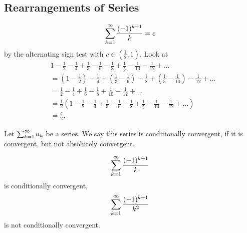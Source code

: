 \documentclass[10pt, a4paper]{article}
\begin{document}
\subsection{Rearrangements of Series}
\[
\sum_{k = 1}^{\infty}\frac{(-1) ^ {k + 1}}{k} = c
\]
by the alternating sign test with $c \in \left(\frac{1}{2}, 1\right)$.
Look at
\begin{align*}
    &1 - \frac{1}{2} - \frac{1}{4} + \frac{1}{3} - \frac{1}{6} - \frac{1}{8} + \frac{1}{5} - \frac{1}{10} - \frac{1}{12} + \dotsc \\
    &= \left(1 - \frac{1}{2}\right) - \frac{1}{4} + \left(\frac{1}{3} - \frac{1}{6}\right) - \frac{1}{8} + \left(\frac{1}{5} - \frac{1}{10}\right) - \frac{1}{12} + \dotsc \\
    &= \frac{1}{2} - \frac{1}{4} + \frac{1}{6} - \frac{1}{8} + \frac{1}{10} - \frac{1}{12} + \dotsc \\
    &= \frac{1}{2}\left(1 - \frac{1}{2} - \frac{1}{4} + \frac{1}{3} - \frac{1}{6} - \frac{1}{8} + \frac{1}{5} - \frac{1}{10} - \frac{1}{12} + \dotsc\right) \\
    &= \frac{c}{2}.
\end{align*}

\begin{definition}
    Let $\sum_{k = 1}^{\infty} a_k$ be a series.
    We say this series is conditionally convergent,
    if it is convergent,
    but not absolutely convergent.
\end{definition}

\begin{example}
    \[
    \sum_{k = 1}^{\infty}\frac{(-1) ^ {k + 1}}{k}
    \]
    is conditionally convergent,
    \[
    \sum_{k = 1}^{\infty}\frac{(-1) ^ {k + 1}}{k ^ 2}
    \]
    is not conditionally convergent.
\end{example}
\end{document}
